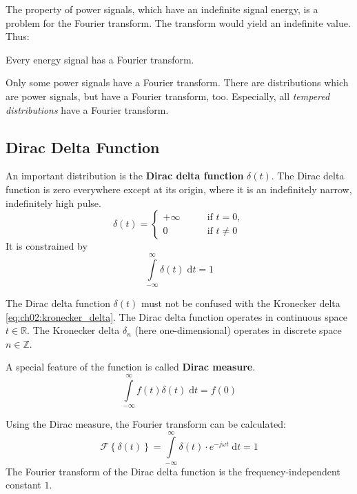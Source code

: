 \begin{refsection}
The property of power signals, which have an indefinite signal energy, is a problem for the Fourier transform. The transform would yield an indefinite value. Thus:
\begin{fact}
	Every energy signal has a Fourier transform.
\end{fact}

Only some power signals have a Fourier transform. There are distributions which are power signals, but have a Fourier transform, too. Especially, all \emph{tempered distributions} have a Fourier transform.

\subsection{Dirac Delta Function}

An important distribution is the  \textbf{Dirac delta function} $\delta(t)$. The Dirac delta function is zero everywhere except at its origin, where it is an indefinitely narrow, indefinitely high pulse.
\begin{equation}
	\delta(t) = \begin{cases}
		+\infty & \qquad \text{if } t = 0, \\
		0 & \qquad \text{if } t \neq 0
	\end{cases}
	\label{eq:ch02:dirac_delta}
\end{equation}
It is constrained by
\begin{equation}
	\int\limits_{-\infty}^{\infty} \delta(t) \; \mathrm{d} t = 1
\end{equation}

\begin{attention}
	The Dirac delta function $\delta(t)$ must not be confused with the Kronecker delta \eqref{eq:ch02:kronecker_delta}. The Dirac delta function operates in continuous space $t \in \mathbb{R}$. The Kronecker delta $\delta_n$ (here one-dimensional) operates in discrete space $n \in \mathbb{Z}$.
\end{attention}

A special feature of the function is called  \textbf{Dirac measure}.
\begin{equation}
	\int\limits_{-\infty}^{\infty} f(t) \delta(t) \; \mathrm{d} t = f(0)
	\label{eq:ch02:dirac_measure}
\end{equation}

Using the Dirac measure, the Fourier transform can be calculated:
\begin{equation}
	\mathcal{F} \left\{\delta(t)\right\} = \int\limits_{-\infty}^{\infty} \delta(t) \cdot e^{-j \omega t} \; \mathrm{d} t = 1
\end{equation}
The Fourier transform of the Dirac delta function is the frequency-independent constant $1$.


\end{refsection}
